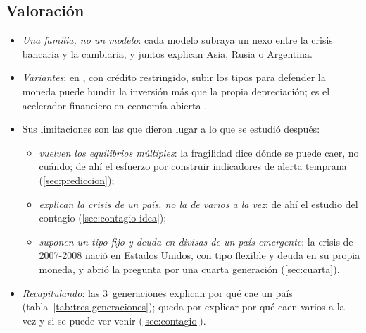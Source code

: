 \documentclass[11pt]{article}
\begin{document}
\subsection{Valoración}\label{sec:tercera-valoracion}

\begin{itemize}
\item \emph{Una familia, no un modelo}: cada modelo subraya un nexo entre la crisis bancaria y la cambiaria, y juntos explican Asia, Rusia o Argentina.
\item \emph{Variantes}: en \textcite{ABB2001Currency}, con crédito restringido, subir los tipos para defender la moneda puede hundir la inversión más que la propia depreciación; es el acelerador financiero en economía abierta .
\item Sus limitaciones son las que dieron lugar a lo que se estudió después:
  \begin{itemize}
  \item \emph{vuelven los equilibrios múltiples}: la fragilidad dice dónde se puede caer, no cuándo; de ahí el esfuerzo por construir indicadores de alerta temprana (\ref{sec:prediccion});
  \item \emph{explican la crisis de un país, no la de varios a la vez}: de ahí el estudio del contagio (\ref{sec:contagio-idea});
  \item \emph{suponen un tipo fijo y deuda en divisas de un país emergente}: la crisis de 2007-2008 nació en Estados Unidos, con tipo flexible y deuda en su propia moneda, y abrió la pregunta por una cuarta generación (\ref{sec:cuarta}).
  \end{itemize}
\item \emph{Recapitulando}: las 3~generaciones explican por qué cae un país (tabla~\ref{tab:tres-generaciones}); queda por explicar por qué caen varios a la vez y si se puede ver venir (\ref{sec:contagio}).
\end{itemize}
\end{document}
